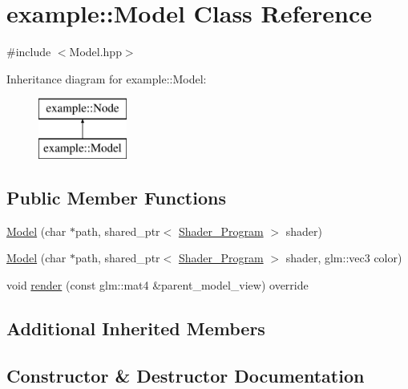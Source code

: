 \hypertarget{classexample_1_1_model}{}\section{example\+:\+:Model Class Reference}
\label{classexample_1_1_model}


{\ttfamily \#include $<$Model.\+hpp$>$}

Inheritance diagram for example\+:\+:Model\+:\begin{figure}[H]
\begin{center}
\leavevmode
\includegraphics[height=2.000000cm]{classexample_1_1_model}
\end{center}
\end{figure}
\subsection*{Public Member Functions}
\begin{DoxyCompactItemize}
\item 
\mbox{\hyperlink{classexample_1_1_model_af955e145332333c5ec8a23fcc24ccd5f}{Model}} (char $\ast$path, shared\+\_\+ptr$<$ \mbox{\hyperlink{classexample_1_1_shader___program}{Shader\+\_\+\+Program}} $>$ shader)
\item 
\mbox{\hyperlink{classexample_1_1_model_a2a701d4681196c9c0312743b1acac645}{Model}} (char $\ast$path, shared\+\_\+ptr$<$ \mbox{\hyperlink{classexample_1_1_shader___program}{Shader\+\_\+\+Program}} $>$ shader, glm\+::vec3 color)
\item 
void \mbox{\hyperlink{classexample_1_1_model_ab280b30836095117f49acc5dfa92daf9}{render}} (const glm\+::mat4 \&parent\+\_\+model\+\_\+view) override
\end{DoxyCompactItemize}
\subsection*{Additional Inherited Members}


\subsection{Constructor \& Destructor Documentation}
\mbox{\label{classexample_1_1_model_af955e145332333c5ec8a23fcc24ccd5f}} 
